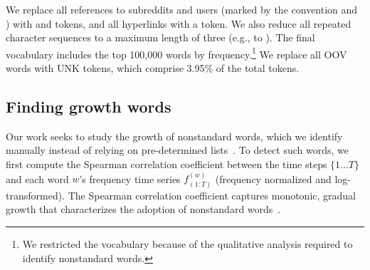 We replace all references to subreddits and users (marked by the convention  and ) with  and  tokens, and all hyperlinks with a  token. 
We also reduce all repeated character sequences to a maximum length of three (e.g.,  to ).
The final vocabulary includes the top 100,000 words by frequency.\footnote{We restricted the vocabulary because of the qualitative analysis required to identify nonstandard words.}
We replace all OOV words with UNK tokens, which comprise 3.95\% of the total tokens.

\subsection{Finding growth words}
\label{subsec:growth_words}


Our work seeks to study the growth of nonstandard words, which we identify manually instead of relying on pre-determined lists~\cite{tredici2018}.%
%
To detect such words, we first compute the Spearman correlation coefficient 
between the time steps $\{1...T\}$ and each word $w$'s frequency time series $f^{(w)}_{(1:T)}$ (frequency normalized and log-transformed).
The Spearman correlation coefficient captures monotonic, gradual growth that characterizes the adoption of nonstandard words~\cite{grieve2016,kershaw2016}.


